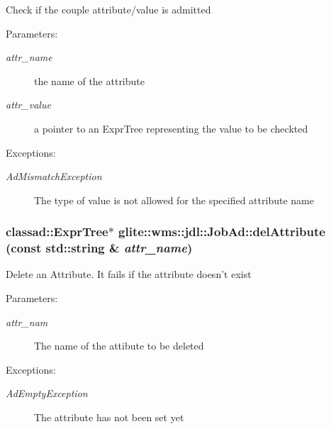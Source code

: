 Check if the couple attribute/value is admitted \begin{Desc}
\item[Parameters:]
\begin{description}
\item[{\em attr\_\-name}]the name of the attribute \item[{\em attr\_\-value}]a pointer to an Expr\-Tree representing the value to be checkted \end{description}
\end{Desc}
\begin{Desc}
\item[Exceptions:]
\begin{description}
\item[{\em Ad\-Mismatch\-Exception}]The type of value is not allowed for the specified attribute name \end{description}
\end{Desc}
\hypertarget{classglite_1_1wms_1_1jdl_1_1JobAd_z9_2}{
\subsubsection[delAttribute]{\setlength{\rightskip}{0pt plus 5cm}classad::Expr\-Tree$\ast$ glite::wms::jdl::Job\-Ad::del\-Attribute (const std::string \& {\em attr\_\-name})}}
\label{classglite_1_1wms_1_1jdl_1_1JobAd_z9_2}


Delete an Attribute. It fails if the attribute doesn't exist \begin{Desc}
\item[Parameters:]
\begin{description}
\item[{\em attr\_\-nam}]The name of the attibute to be deleted \end{description}
\end{Desc}
\begin{Desc}
\item[Exceptions:]
\begin{description}
\item[{\em Ad\-Empty\-Exception}]The attribute has not been set yet \end{description}
\end{Desc}


